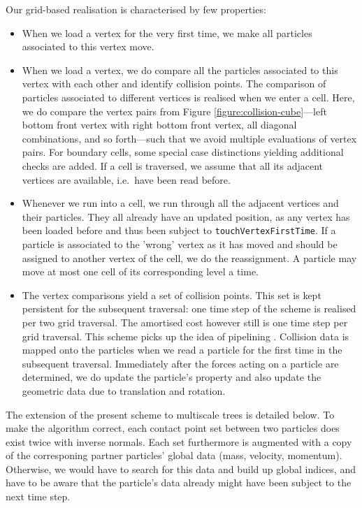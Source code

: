 Our grid-based realisation is characterised by few properties:
\begin{itemize}
  \item When we load a vertex for the very first time, we make all particles
  associated to this vertex move. 
  \item When we load a vertex, we do compare all the particles associated to
  this vertex with each other and identify collision points. The comparison of
  particles associated to different vertices is realised when we enter a cell.
  Here, we do compare the vertex pairs from Figure \ref{figure:collision-cube}---left bottom
  front vertex with right bottom front vertex, all diagonal combinations, and
  so forth---such that we avoid multiple evaluations of vertex pairs. For 
  boundary cells, some special case distinctions yielding additional checks are
  added. If a cell is traversed, we assume that all its adjacent vertices are
  available, i.e.~have been read before.
  \item Whenever we run into a cell, we run through all the adjacent vertices
  and their particles. They all already have an updated position, as any vertex
  has been loaded before and thus been subject to \texttt{touchVertexFirstTime}.
  If a particle is associated to the 'wrong' vertex as it has moved and should 
  be assigned to another vertex of the cell, we do the reassignment. A particle
  may move at most one cell of its corresponding level a time.
  \item The vertex comparisons yield a set of collision points. This set is kept
  persistent for the subsequent traversal: one time step of the scheme is
  realised per two grid traversal. The amortised cost however still is one time
  step per grid traversal. This scheme picks up the idea of pipelining
  \cite{Plimpton1995}. Collision data is mapped onto the particles when we read a
  particle for the first time in the subsequent traversal. Immediately after the
  forces acting on a particle are determined, we do update the particle's
  property and also update the geometric data due to translation and rotation.
\end{itemize}

\noindent
The extension of the present scheme to multiscale trees is detailed below.
To make the algorithm correct, each contact point set between two particles does
exist twice with inverse normals.
Each set furthermore is augmented with a copy of the corresponing partner
particles' global data (mass, velocity, momentum).
Otherwise, we would have to search for this data and build up global indices,
and have to be aware that the particle's data already might have been subject to
the next time step.



